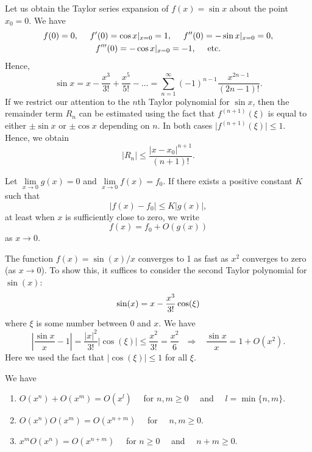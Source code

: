 \begin{example}
Let us obtain the Taylor series expansion of
$f(x)=\sin x$ about the point $x_{0}=0$.
We have
\begin{gather*}
f(0)=0, ~~~~ f^{\prime}(0)=\cos x\vert_{x=0}=1, ~~~~
f^{\prime\prime}(0)=-\sin x\vert_{x=0}=0, \\
f^{\prime\prime\prime}(0)=-\cos x\vert_{x=0}=-1, ~~~~
{\rm etc.}
\end{gather*}
Hence,
\[
\sin x=x-\frac{x^{3}}{3!}+\frac{x^{5}}{5!}-\dots=
\sum_{n=1}^{\infty}(-1)^{n-1}\frac{x^{2n-1}}{(2n-1)!}.
\]
If we restrict our attention to the $n$th Taylor polynomial for
$\sin x$, then the remainder term $R_{n}$ can be estimated using the
fact that $f^{(n+1)}(\xi)$ is equal to
either $\pm\sin x$ or $\pm\cos x$ depending on $n$. In both cases
$\vert f^{(n+1)}(\xi)\vert\leq 1$. Hence, we obtain
\[
\vert R_{n}\vert \leq\frac{\vert x-x_{0}\vert^{n+1}}{(n+1)!}.
\]
\end{example}

\begin{definition} Let $\lim\limits_{x\to 0}g(x)=0$ and
$\lim\limits_{x\to 0}f(x)=f_{0}$. If there exists
a positive constant $K$ such that
\[
\vert f(x)-f_{0}\vert   \leq K \vert g(x)\vert,
\]
at least when $x$ is sufficiently close to zero, we write
\[
f(x)=f_{0}+O(g(x))
\]
as $x\to 0$.
\end{definition}

\begin{example}
The function $f(x)=\sin(x)/x$ converges to 1 as fast
as $x^{2}$ converges to zero (as $x\to 0$). To show this,
it suffices to consider the second Taylor polynomial for $\sin(x)$:
\[
\sin(x)=x-{x^{3} \over 3!}\cos(\xi)
\]
where $\xi$ is some number between 0 and $x$. We have
\[
\left\vert \frac{\sin x}{x} -1 \right\vert = \frac{\vert x
\vert^{2}}{3!}\vert \cos(\xi)\vert \leq \frac{x^{2}}{3!}=\frac{x^{2}}{6} \ \ \
\Rightarrow \ \ \ \ \frac{\sin x}{x}=1+O(x^{2}).
\]
Here we used the fact that $\vert\cos(\xi)\vert\leq 1$ for all $\xi$.
\end{example}

\begin{lemma}[Properties of $O(x^n)$]
We have
\begin{enumerate}

\item $O(x^n)+O(x^m)=O(x^l)$ \ \ for $n,m \geq 0$ \ \ and \ \ $l=\min\{n,m\}$.

\item $O(x^n)O(x^m)=O(x^{n+m})$ \ \ for \ \ $n,m \geq 0$.

\item $x^m O(x^n)=O(x^{n+m})$ \ \ for $n \geq 0$ \ \ and \ \ $n+m \geq 0$.
\end{enumerate}
\end{lemma}

